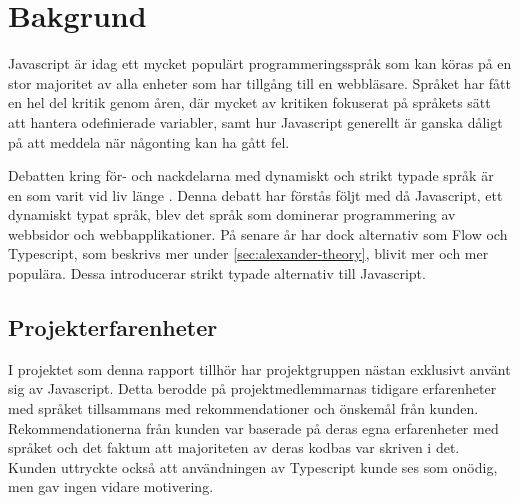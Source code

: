 \section{Bakgrund}
\label{sec:alexander-background}

Javascript är idag ett mycket populärt programmeringsspråk som kan köras på en stor majoritet av alla enheter som har tillgång till en webbläsare. Språket har fått en hel del kritik genom åren, där mycket av kritiken fokuserat på språkets sätt att hantera odefinierade variabler, samt hur Javascript generellt är ganska dåligt på att meddela när någonting kan ha gått fel.

Debatten kring för- och nackdelarna med dynamiskt och strikt typade språk är en som varit vid liv länge \cite{old-type-debate}. Denna debatt har förstås följt med då Javascript, ett dynamiskt typat språk, blev det språk som dominerar programmering av webbsidor och webbapplikationer. På senare år har dock alternativ som Flow och Typescript, som beskrivs mer under \ref{sec:alexander-theory}, blivit mer och mer populära. Dessa introducerar strikt typade alternativ till Javascript.

\subsection{Projekterfarenheter}
I projektet som denna rapport tillhör har projektgruppen nästan exklusivt använt sig av Javascript. Detta berodde på projektmedlemmarnas tidigare erfarenheter med språket tillsammans med rekommendationer och önskemål från kunden. Rekommendationerna från kunden var baserade på deras egna erfarenheter med språket och det faktum att majoriteten av deras kodbas var skriven i det. Kunden uttryckte också att användningen av Typescript kunde ses som onödig, men gav ingen vidare motivering.